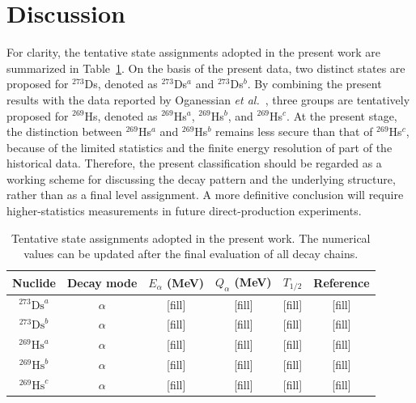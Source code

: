 \documentclass[final,5p,times,twocolumn,number,sort&compress]{elsarticle}
\begin{document}
\section{Discussion}

For clarity, the tentative state assignments adopted in the present work are summarized in Table~\ref{tab:state_summary}. On the basis of the present data, two distinct states are proposed for $^{273}$Ds, denoted as $^{273}$Ds$^{a}$ and $^{273}$Ds$^{b}$. By combining the present results with the data reported by Oganessian \textit{et al.}~\cite{oganessian2024SynthesisDecayProperties}, three groups are tentatively proposed for $^{269}$Hs, denoted as $^{269}$Hs$^{a}$, $^{269}$Hs$^{b}$, and $^{269}$Hs$^{c}$. At the present stage, the distinction between $^{269}$Hs$^{a}$ and $^{269}$Hs$^{b}$ remains less secure than that of $^{269}$Hs$^{c}$, because of the limited statistics and the finite energy resolution of part of the historical data. Therefore, the present classification should be regarded as a working scheme for discussing the decay pattern and the underlying structure, rather than as a final level assignment. A more definitive conclusion will require higher-statistics measurements in future direct-production experiments.

\begin{table}[htbp]
\centering
\caption{Tentative state assignments adopted in the present work. The numerical values can be updated after the final evaluation of all decay chains.}
\label{tab:state_summary}
\setlength{\tabcolsep}{4pt}
\renewcommand{\arraystretch}{1.08}
\small
\begin{tabular}{cccccc}
\toprule
Nuclide & Decay mode & $E_{\alpha}$ (MeV) & $Q_{\alpha}$ (MeV) & $T_{1/2}$ & Reference \\
\midrule
$^{273}\mathrm{Ds}^{a}$ & $\alpha$ & [fill] & [fill] & [fill] & [fill] \\
$^{273}\mathrm{Ds}^{b}$ & $\alpha$  & [fill] & [fill]  & [fill] & [fill] \\
$^{269}\mathrm{Hs}^{a}$ & $\alpha$ & [fill] & [fill]  & [fill] & [fill] \\
$^{269}\mathrm{Hs}^{b}$ & $\alpha$ & [fill] & [fill]  & [fill] & [fill] \\
$^{269}\mathrm{Hs}^{c}$ & $\alpha$  & [fill] & [fill]  & [fill] & [fill] \\
\bottomrule
\end{tabular}
\end{table}
\end{document}

